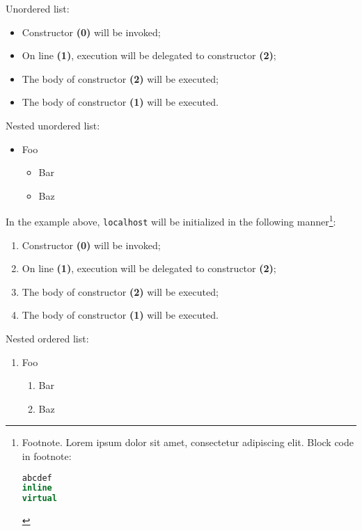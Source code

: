 \documentclass[twoside,10pt,letterpaper,usenames]{newstyle-PearsonGeneric-7-38}
\begin{document}
Unordered list:

\begin{itemize}
\item{Constructor \textbf{(0)} will be invoked;}
\item{On line \textbf{(1)}, execution will be delegated to constructor \textbf{(2)};}
\item{The body of constructor \textbf{(2)} will be executed;}
\item{The body of constructor \textbf{(1)} will be executed.}
\end{itemize}

Nested unordered list:

\begin{itemize}
\item{Foo\begin{itemize}
\item{Bar}
\item{Baz}
\end{itemize}
}
\end{itemize}

In the example above, \texttt{localhost} will be initialized in the
following manner{\cprotect\footnote{Footnote. Lorem ipsum dolor sit
amet, consectetur adipiscing elit. Block code in footnote:

\begin{lstlisting}[language=C++, basicstyle={\ttfamily\footnotesize}]
abcdef
inline
virtual
\end{lstlisting}
}}:

\begin{enumerate}
\item{Constructor \textbf{(0)} will be invoked;}
\item{On line \textbf{(1)}, execution will be delegated to constructor \textbf{(2)};}
\item{The body of constructor \textbf{(2)} will be executed;}
\item{The body of constructor \textbf{(1)} will be executed.}
\end{enumerate}

Nested ordered list:

\begin{enumerate}
\item{Foo\begin{enumerate}
\item{Bar}
\item{Baz}
\end{enumerate}
}
\end{enumerate}
\end{document}
